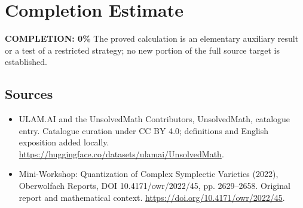 \documentclass[11pt]{article}
\begin{document}
\section{Completion Estimate}
\noindent\textbf{COMPLETION: 0\%}
The proved calculation is an elementary auxiliary result or a test of a restricted strategy; no new portion of the full source target is established.

\subsection{Sources}
\begin{itemize}
\item[\hypertarget{source:statement:1}{S1}] ULAM.AI and the UnsolvedMath Contributors, UnsolvedMath, catalogue entry. Catalogue curation under CC BY 4.0; definitions and English exposition added locally.
\url{https://huggingface.co/datasets/ulamai/UnsolvedMath}.
\item[\hypertarget{source:statement:2}{S2}] Mini-Workshop: Quantization of Complex Symplectic Varieties (2022), Oberwolfach Reports, DOI 10.4171/owr/2022/45, pp. 2629--2658. Original report and mathematical context.
\url{https://doi.org/10.4171/owr/2022/45}.
\end{itemize}
\label{end:statement}
\end{document}
